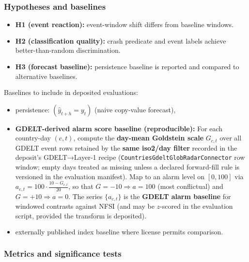 \documentclass[
  11pt,
  peerreview,journal,onecolumn]{IEEEtran}
\newcommand{\passthrough}[1]{#1}
\providecommand{\tightlist}{%
  \setlength{\itemsep}{0pt}\setlength{\parskip}{0pt}}
\begin{document}
\hypertarget{hypotheses-and-baselines}{%
\subsubsection{Hypotheses and
baselines}\label{hypotheses-and-baselines}}

\begin{itemize}
\tightlist
\item
  \textbf{H1 (event reaction):} event-window shift differs from baseline
  windows.\\
\item
  \textbf{H2 (classification quality):} crash predicate and event labels
  achieve better-than-random discrimination.\\
\item
  \textbf{H3 (forecast baseline):} persistence baseline is reported and
  compared to alternative baselines.
\end{itemize}

Baselines to include in deposited evaluations:

\begin{itemize}
\item
  persistence: \((\hat{y}_{t+h} = y_t)\) (naive copy-value forecast),
\item
  \textbf{GDELT-derived alarm score baseline (reproducible):} For each
  country-day \((c,t)\), compute the \textbf{day-mean Goldstein scale}
  \(G_{c,t}\) over all GDELT event rows retained by the \textbf{same
  iso2/day filter} recorded in the deposit's GDELT→Layer‑1 recipe
  (\passthrough{\lstinline!CountriesGdeltGlobRadarConnector!} row
  window; empty days treated as missing unless a declared forward-fill
  rule is versioned in the evaluation manifest). Map to an alarm level
  on \([0,100]\) via \(a_{c,t} = 100 \cdot \frac{10 - G_{c,t}}{20}\), so
  that \(G=-10 \Rightarrow a=100\) (most conflictual) and
  \(G=+10 \Rightarrow a=0\). The series \(\{a_{c,t}\}\) is the
  \textbf{GDELT alarm baseline} for windowed contrasts against NFSI (and
  may be \(z\)-scored in the evaluation script, provided the transform
  is deposited).
\item
  externally published index baseline where license permits comparison.
\end{itemize}

\hypertarget{metrics-and-significance-tests}{%
\subsubsection{Metrics and significance
tests}\label{metrics-and-significance-tests}}
\end{document}
